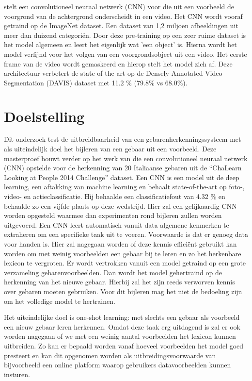 \npar \cite{oneshot-video-segm} stelt een convolutioneel neuraal netwerk (CNN) voor die uit een voorbeeld de voorgrond van de achtergrond onderscheidt in een video. Het CNN wordt vooraf getraind op de ImageNet dataset. Een dataset van 1,2 miljoen afbeeldingen uit meer dan duizend categori\"en. Door deze pre-training op een zeer ruime dataset is het model algemeen en leert het eigenlijk wat 'een object' is. Hierna wordt het model verfijnd voor het volgen van een voorgrondsobject uit een video. Het eerste frame van de video wordt gemaskeerd en hierop stelt het model zich af. Deze architectuur verbetert de state-of-the-art op de Densely Annotated Video Segmentation (DAVIS) dataset met 11.2 \% (79.8\% vs 68.0\%).

\section{Doelstelling}
Dit onderzoek test de uitbreidbaarheid van een gebarenherkenningssysteem met als uiteindelijk doel het bijleren van een gebaar uit een voorbeeld.
\npar Deze masterproef bouwt verder op het werk van \cite{lionel} die een convolutioneel neuraal netwerk (CNN) opstelde voor de herkenning van 20 Italiaanse gebaren uit de ``ChaLearn Looking at People 2014 Challenge'' dataset. Een CNN is een model uit de deep learning, een aftakking van machine learning en behaalt state-of-the-art op foto-, video- en actieclassificatie.  Hij behaalde een classificatiefout van 4.32 \% en behaalde zo een vijfde plaats op deze wedstrijd. Hier zal een gelijkaardig CNN worden opgesteld waarmee dan experimenten rond bijleren zullen worden uitgevoerd.
\npar Een CNN leert automatisch vanuit data algemene kenmerken te extraheren om een specifieke taak uit te voeren. Voorwaarde is dat er genoeg data voor handen is. Hier zal nagegaan worden of deze kennis effici\"ent gebruikt kan worden om met weinig voorbeelden een gebaar bij te leren en zo het herkenbare lexicon te vergroten. Er wordt vertrokken vanuit een model getraind op een grote verzameling gebarenvoorbeelden. Dan wordt het model gehertraind op de herkenning van het nieuwe gebaar. Hierbij zal het zijn reeds verworven kennis over gebaren moeten gebruiken. Voor dit bijleren mag het niet de bedoeling zijn om het volledige model te hertrainen.

\npar  Het uiteindelijke doel is one-shot learning: met slechts een gebaar als voorbeeld een nieuw gebaar leren herkennen.  Omdat deze taak erg uitdagend is zal er ook worden nagegaan of we met een weinig aantal voorbeelden het lexicon kunnen uitbreiden. Zo kan er bepaald worden vanaf hoeveel voorbeelden het model goed presteert en kan dit opgenomen worden als uitbreidingsvoorwaarde van bijvoorbeeld een online platform waarop gebruikers datavoorbeelden kunnen insturen.

